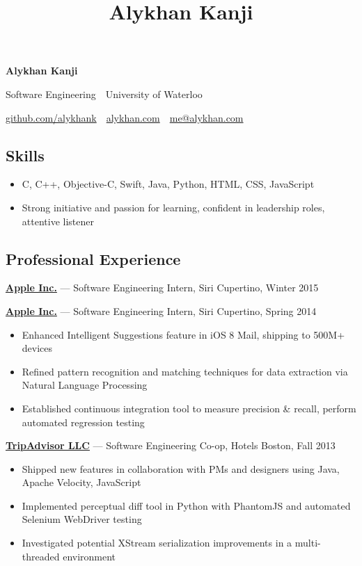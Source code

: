 \documentclass[11pt,letterpaper]{article}
\title{Alykhan Kanji}
\begin{document}
\begin{center}
  {\Huge \textbf{Alykhan Kanji}}

  {\large
    Software Engineering\ \textperiodcentered \ University of Waterloo

    \href{https://github.com/alykhank}{github.com/alykhank}\ \textperiodcentered \ \href{http://alykhan.com}{alykhan.com}\ \textperiodcentered \ \href{mailto:me@alykhan.com}{me@alykhan.com}
  }
\end{center}

\subsection*{Skills}
\begin{itemize}[before=,after=]
  \item C, C++, Objective-C, Swift, Java, Python, HTML, CSS, JavaScript
  \item Strong initiative and passion for learning, confident in leadership roles, attentive listener
\end{itemize}

\subsection*{Professional Experience}
\noindent
\href{http://apple.com}{\textbf{Apple Inc.}} --- Software Engineering Intern, Siri \hfill {\color{gray} Cupertino, Winter 2015}
\vspace{6mm}

\noindent
\href{http://apple.com}{\textbf{Apple Inc.}} --- Software Engineering Intern, Siri \hfill {\color{gray} Cupertino, Spring 2014}
\begin{itemize}
  \item Enhanced Intelligent Suggestions feature in iOS 8 Mail, shipping to 500M+ devices
  \item Refined pattern recognition and matching techniques for data extraction via Natural Language Processing
  \item Established continuous integration tool to measure precision \& recall, perform automated regression testing
\end{itemize}

\noindent
\href{http://tripadvisor.com}{\textbf{TripAdvisor LLC}} --- Software Engineering Co-op, Hotels \hfill {\color{gray} Boston, Fall 2013}
\begin{itemize}
  \item Shipped new features in collaboration with PMs and designers using Java, Apache Velocity, JavaScript
  \item Implemented perceptual diff tool in Python with PhantomJS and automated Selenium WebDriver testing
  \item Investigated potential XStream serialization improvements in a multi-threaded environment
\end{itemize}
\end{document}
